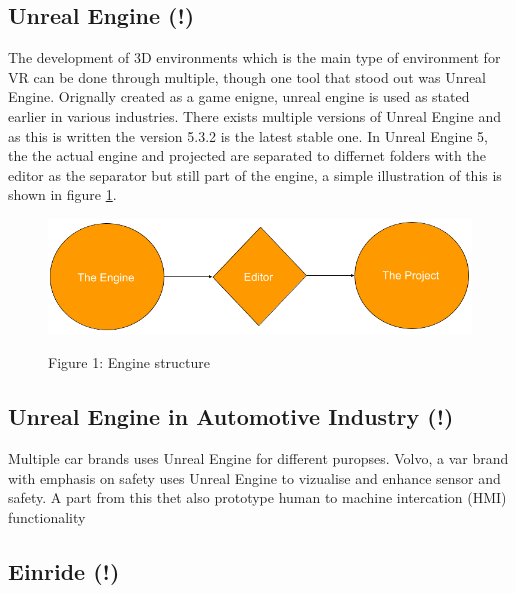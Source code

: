 \subsection{Unreal Engine (!)}
The development of 3D environments which is the main type of environment for VR can be done through multiple, 
though one tool that stood out was Unreal Engine. Orignally created as a game enigne, unreal engine is used
as stated earlier in various industries. There exists multiple versions of Unreal Engine and as this is
written the version 5.3.2 is the latest stable one. In Unreal Engine 5, the the actual engine and projected
are separated to differnet folders with the editor as the separator but still part of the engine, a simple 
illustration of this is shown in figure \ref{figure 1}.
\begin{figure}
    \includegraphics[width=1.0\textwidth]{SimpleEngineToProject.png}
    \centering
    \label{figure 1}
    \caption[short]{Figure 1: Engine structure}
\end{figure}
\subsection{Unreal Engine in Automotive Industry (!)}
Multiple car brands uses Unreal Engine for different puropses. Volvo, a var brand with emphasis on safety
uses Unreal Engine to vizualise and enhance sensor and safety. A part from this thet also prototype human
to machine intercation (HMI) functionality 
\subsection{Einride (!)}
